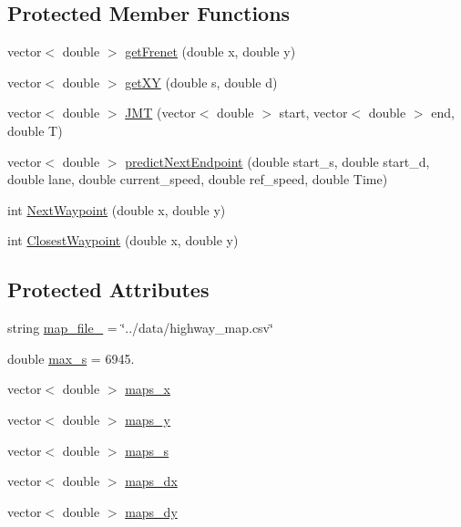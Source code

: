 \subsection*{Protected Member Functions}
\begin{DoxyCompactItemize}
\item 
vector$<$ double $>$ \hyperlink{classTrajectoryPlannerWIP_a90ba8175932f377a2f56795edb8eb1eb}{get\+Frenet} (double x, double y)
\item 
vector$<$ double $>$ \hyperlink{classTrajectoryPlannerWIP_a6c4a03d5e4f4b78bdbd91debe2d1b246}{get\+XY} (double s, double d)
\item 
vector$<$ double $>$ \hyperlink{classTrajectoryPlannerWIP_ac2053a967111d1f776616ea7a473cfa0}{J\+MT} (vector$<$ double $>$ start, vector$<$ double $>$ end, double T)
\item 
vector$<$ double $>$ \hyperlink{classTrajectoryPlannerWIP_a836cd57fcddc08790c6c4a33249e3161}{predict\+Next\+Endpoint} (double start\+\_\+s, double start\+\_\+d, double lane, double current\+\_\+speed, double ref\+\_\+speed, double Time)
\item 
int \hyperlink{classTrajectoryPlannerWIP_afcec4651796ba110751bddeb25f223fa}{Next\+Waypoint} (double x, double y)
\item 
int \hyperlink{classTrajectoryPlannerWIP_a9f787291e9065422a9c649c6b24acf8e}{Closest\+Waypoint} (double x, double y)
\end{DoxyCompactItemize}
\subsection*{Protected Attributes}
\begin{DoxyCompactItemize}
\item 
string \hyperlink{classTrajectoryPlannerWIP_a87aa1ae8bce8788c8fab3db76b92997c}{map\+\_\+file\+\_\+} = \char`\"{}../data/highway\+\_\+map.\+csv\char`\"{}
\item 
double \hyperlink{classTrajectoryPlannerWIP_a43501cae77daf85f811ed0873d9bf960}{max\+\_\+s} = 6945.
\item 
vector$<$ double $>$ \hyperlink{classTrajectoryPlannerWIP_abaa6f54058eb01c7c16df360c6883496}{maps\+\_\+x}
\item 
vector$<$ double $>$ \hyperlink{classTrajectoryPlannerWIP_a17cfcc4b66e5fff8a1802e5fc9dd7639}{maps\+\_\+y}
\item 
vector$<$ double $>$ \hyperlink{classTrajectoryPlannerWIP_a38af64be0ca058c3ac72d6cf2883de9f}{maps\+\_\+s}
\item 
vector$<$ double $>$ \hyperlink{classTrajectoryPlannerWIP_a60657fd8df138c58a1a9333f07f73f7e}{maps\+\_\+dx}
\item 
vector$<$ double $>$ \hyperlink{classTrajectoryPlannerWIP_ae1fd51251d18023cc395eff388785b13}{maps\+\_\+dy}
\end{DoxyCompactItemize}


